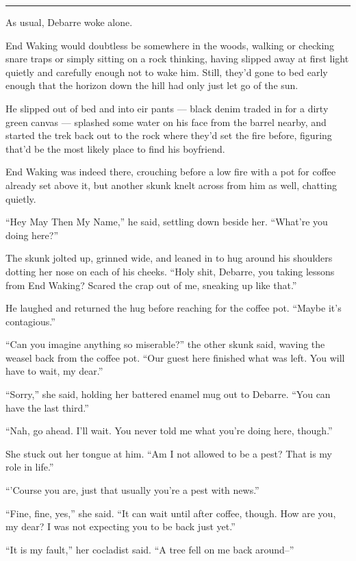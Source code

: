 \begin{center}\rule{0.5\linewidth}{0.5pt}\end{center}

As usual, Debarre woke alone.

End Waking would doubtless be somewhere in the woods, walking or checking snare traps or simply sitting on a rock thinking, having slipped away at first light quietly and carefully enough not to wake him. Still, they'd gone to bed early enough that the horizon down the hill had only just let go of the sun.

He slipped out of bed and into eir pants — black denim traded in for a dirty green canvas — splashed some water on his face from the barrel nearby, and started the trek back out to the rock where they'd set the fire before, figuring that'd be the most likely place to find his boyfriend.

End Waking was indeed there, crouching before a low fire with a pot for coffee already set above it, but another skunk knelt across from him as well, chatting quietly.

``Hey May Then My Name,'' he said, settling down beside her. ``What're you doing here?''

The skunk jolted up, grinned wide, and leaned in to hug around his shoulders dotting her nose on each of his cheeks. ``Holy shit, Debarre, you taking lessons from End Waking? Scared the crap out of me, sneaking up like that.''

He laughed and returned the hug before reaching for the coffee pot. ``Maybe it's contagious.''

``Can you imagine anything so miserable?'' the other skunk said, waving the weasel back from the coffee pot. ``Our guest here finished what was left. You will have to wait, my dear.''

``Sorry,'' she said, holding her battered enamel mug out to Debarre. ``You can have the last third.''

``Nah, go ahead. I'll wait. You never told me what you're doing here, though.''

She stuck out her tongue at him. ``Am I not allowed to be a pest? That is my role in life.''

``'Course you are, just that usually you're a pest with news.''

``Fine, fine, yes,'' she said. ``It can wait until after coffee, though. How are you, my dear? I was not expecting you to be back just yet.''

``It is my fault,'' her cocladist said. ``A tree fell on me back around--''

